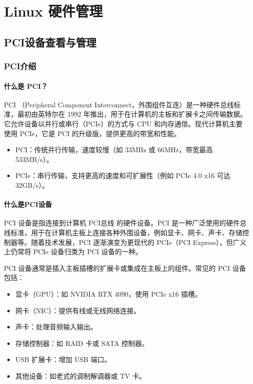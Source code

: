 \chapter{Linux 硬件管理}
\section{PCI设备查看与管理}
\subsection{PCI介绍}
\subsubsection{什么是 PCI？}
PCI （Peripheral Component Interconnect，外围组件互连）是一种硬件总线标准，最初由英特尔在 1992 年推出，用于在计算机的主板和扩展卡之间传输数据。它允许设备以并行或串行（PCIe）的方式与 CPU 和内存通信。现代计算机主要使用 PCIe，它是 PCI 的升级版，提供更高的带宽和性能。
\begin{itemize}
\item PCI：传统并行传输，速度较慢（如 33MHz 或 66MHz，带宽最高 533MB/s）。
\item PCIe：串行传输，支持更高的速度和可扩展性（例如 PCIe 4.0 x16 可达 32GB/s）。
\end{itemize}


\subsubsection{什么是PCI设备}
PCI 设备是指连接到计算机 PCI总线 的硬件设备。PCI 是一种广泛使用的硬件总线标准，用于在计算机主板上连接各种外围设备，例如显卡、网卡、声卡、存储控制器等。随着技术发展，PCI 逐渐演变为更现代的 PCIe（PCI Express），但广义上仍常将 PCIe 设备归类为 PCI 设备的一种。

PCI 设备通常是插入主板插槽的扩展卡或集成在主板上的组件。常见的 PCI 设备包括：
\begin{itemize}
\item 显卡（GPU）：如 NVIDIA RTX 4090，使用 PCIe x16 插槽。
\item 网卡（NIC）：提供有线或无线网络连接。
\item 声卡：处理音频输入输出。
\item 存储控制器：如 RAID 卡或 SATA 控制器。
\item USB 扩展卡：增加 USB 端口。
\item 其他设备：如老式的调制解调器或 TV 卡。
\end{itemize}



